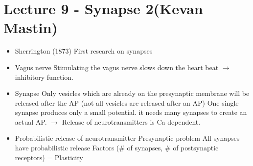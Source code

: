 \documentclass[english,11pt]{article}
\begin{document}
\section{Lecture 9 - Synapse 2(Kevan Mastin)}
\begin{itemize}
\item Sherrington (1873)
\subitem First research on synapses
\item Vagus nerve
\subitem Stimulating the vagus nerve slows down the heart beat $\rightarrow$ inhibitory function.
\item Synapse
\subitem Only vesicles which are already on the presynaptic membrane will be released after the AP (not all vesicles are released after an AP)
\subitem One single synapse produces only a small potential. it needs many synapses to create an actual AP. $\rightarrow$ Release of neurotransmitters is Ca dependent.
\item Probabilistic release of neurotransmitter
\subitem Presynaptic problem
\subitem All synapses have probabilistic release
\subitem Factors (\# of synapses, \# of postsynaptic receptors) = Plasticity
\end{itemize}
\end{document}
